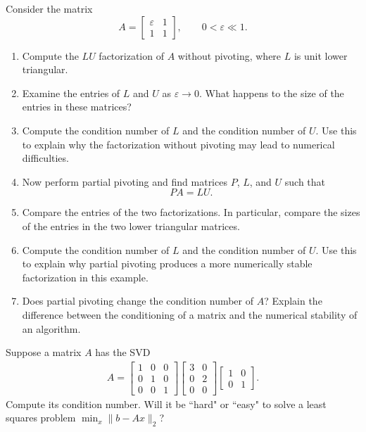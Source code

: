 \documentclass{ximera}
\begin{document}
\begin{exercise}
Consider the matrix
\[
A=
\begin{bmatrix}
\varepsilon & 1\\
1 & 1
\end{bmatrix},
\qquad 0<\varepsilon\ll 1.
\]

\begin{enumerate}
    \item Compute the $LU$ factorization of $A$ without pivoting, where $L$ is unit lower triangular.

    \item Examine the entries of $L$ and $U$ as $\varepsilon\to 0$. What happens to the size of the entries in these matrices?

    \item Compute the condition number of $L$ and the condition number of $U$.  Use this to explain why the factorization without pivoting may lead to numerical difficulties.

    \item Now perform partial pivoting and find matrices $P$, $L$, and $U$ such that
    \[
    PA=LU.
    \]

    \item Compare the entries of the two factorizations. In particular, compare the sizes of the entries in the two lower triangular matrices.

    \item Compute the condition number of $L$ and the condition number of $U$.  Use this to explain why partial pivoting produces a more numerically stable factorization in this example.

    \item Does partial pivoting change the condition number of $A$? Explain the difference between the conditioning of a matrix and the numerical stability of an algorithm.
\end{enumerate}
\end{exercise}


\begin{exercise}
     Suppose a matrix $A$ has the SVD
    \begin{align*}
        A = \begin{bmatrix}  1 &0 &0 \\ 0& 1 & 0 \\ 0 & 0 &1\end{bmatrix} \begin{bmatrix} 3 &0 \\ 0 & 2 \\ 0 & 0\end{bmatrix} \begin{bmatrix}
            1 & 0 \\ 0 & 1
        \end{bmatrix}.
        \end{align*}
        Compute its condition number.  Will it be ``hard" or ``easy" to solve a least squares problem $\min_x \|b-Ax\|_2$?
\end{exercise}
\end{document}
